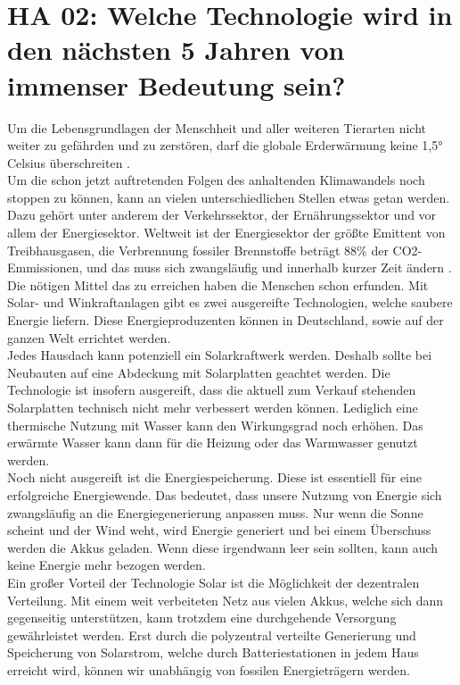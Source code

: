 \section{HA 02: Welche Technologie wird in den nächsten 5 Jahren von immenser Bedeutung sein?}
  Um die Lebensgrundlagen der Menschheit und aller weiteren Tierarten nicht weiter zu gefährden und zu zerstören, darf die globale Erderwärmung keine 1,5° Celsius überschreiten \cite{masson-delmotte_ipcc_2019}.\\
  Um die schon jetzt auftretenden Folgen des anhaltenden Klimawandels noch stoppen zu können, kann an vielen unterschiedlichen Stellen etwas getan werden. Dazu gehört unter anderem der Verkehrssektor, der Ernährungssektor und vor allem der Energiesektor. Weltweit ist der Energiesektor der größte Emittent von Treibhausgasen, die Verbrennung fossiler Brennstoffe beträgt 88\% der CO2-Emmissionen, und das muss sich zwangsläufig und innerhalb kurzer Zeit ändern \cite{quaschning_regenerative_2019}.\\
  Die nötigen Mittel das zu erreichen haben die Menschen schon erfunden. Mit Solar- und Winkraftanlagen gibt es zwei ausgereifte Technologien, welche saubere Energie liefern. Diese Energieproduzenten können in Deutschland, sowie auf der ganzen Welt errichtet werden. \\
  Jedes Hausdach kann potenziell ein Solarkraftwerk werden. Deshalb sollte bei Neubauten auf eine Abdeckung mit Solarplatten geachtet werden. Die Technologie ist insofern ausgereift, dass die aktuell zum Verkauf stehenden Solarplatten technisch nicht mehr verbessert werden können. Lediglich eine thermische Nutzung mit Wasser kann den Wirkungsgrad noch erhöhen. Das erwärmte Wasser kann dann für die Heizung oder das Warmwasser genutzt werden.\\
  Noch nicht ausgereift ist die Energiespeicherung. Diese ist essentiell für eine erfolgreiche Energiewende. Das bedeutet, dass unsere Nutzung von Energie sich zwangsläufig an die Energiegenerierung anpassen muss. Nur wenn die Sonne scheint und der Wind weht, wird Energie generiert und bei einem Überschuss werden die Akkus geladen. Wenn diese irgendwann leer sein sollten, kann auch keine Energie mehr bezogen werden.\\
  Ein großer Vorteil der Technologie Solar ist die Möglichkeit der dezentralen Verteilung. Mit einem weit verbeiteten Netz aus vielen Akkus, welche sich dann gegenseitig unterstützen, kann trotzdem eine durchgehende Versorgung gewährleistet werden. Erst durch die polyzentral verteilte Generierung und Speicherung von Solarstrom, welche durch Batteriestationen in jedem Haus erreicht wird, können wir unabhängig von fossilen Energieträgern werden.\\
